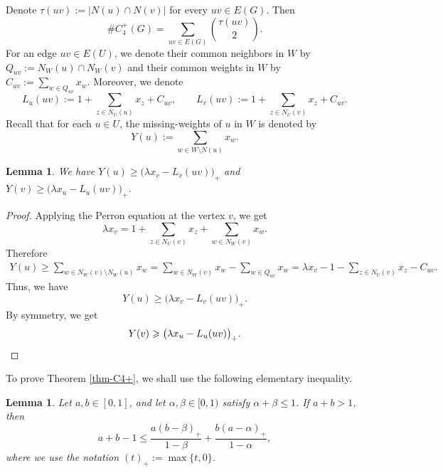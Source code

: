 \documentclass[11pt,a4paper]{article}
\newtheorem{lemma}[theorem]{Lemma}
\theoremstyle{definition}
\theoremstyle{plain}
\renewcommand{\le}{\leqslant}
\renewcommand{\ge}{\geqslant}
\begin{document}
\smallskip 
Denote $  \tau(uv):=|N(u)\cap N(v)|$ for every  $uv\in E(G)$. 
Then
\begin{equation}\label{eq:kite-book-count}
        \texttt{\#}{C_4^+}(G)=\sum_{uv\in E(G)}{\tau(uv)\choose 2}.
\end{equation}  
For an edge \(uv\in E(U)\), we denote their  common neighbors in $W$ by 
$ Q_{uv}:=N_W(u)\cap N_W(v)$ 
and their common weights in $W$ by 
$C_{uv}:=\sum_{w\in Q_{uv}}x_w$. 
Moreover, we denote 
\[
        L_u(uv):=1+\sum_{z\in N_U(u)}x_z +C_{uv},
        \qquad
        L_v(uv):=1+ \sum_{z\in N_U(v)}x_z +C_{uv}.
\]
Recall that for each $u\in U$, the missing-weights of $u$ in $W$ is denoted by 
$$ Y(u) :=\sum_{w\in W\setminus N(u)}x_w. $$ 

\begin{lemma} \label{lem:Yu-Yv-lower-weighted}
    We have $Y(u)\ge \bigl(\lambda x_v-L_v(uv)\bigr)_+$ and $Y(v)\ge \bigl(\lambda x_u-L_u(uv)\bigr)_+$. 
\end{lemma}

\begin{proof} 
Applying the Perron equation at the vertex \(v\), we get
\[
        \lambda x_v
        =
        1+\sum_{z\in N_U(v)}x_z+\sum_{w\in N_W(v)}x_w .
\]
Therefore
\[
\begin{aligned}
        Y(u)     
        \ge
        \sum_{w\in N_W(v)\setminus N_W(u)}x_w     =
        \sum_{w\in N_W(v)}x_w-\sum_{w\in Q_{uv}}x_w  =
        \lambda x_v-1- \sum_{z\in N_U(v)}x_z -C_{uv}.
\end{aligned}
\]
Thus, we have 
\begin{equation*}
        Y(u)\ge \bigl(\lambda x_v-L_v(uv)\bigr)_+.
\end{equation*}
By symmetry, we get 
\begin{equation*}
        Y(v)\ge \bigl(\lambda x_u-L_u(uv)\bigr)_+. \qedhere 
\end{equation*} 
\end{proof}

To prove Theorem \ref{thm-C4+}, 
we shall use the following elementary inequality.

\begin{lemma}\label{lem:kite-algebra}
Let \(a,b\in[0,1]\), and let \(\alpha,\beta\in[0,1)\) satisfy
\(\alpha+\beta\le1\).  If \(a+b>1\), then
\[
        a+b-1
        \le
        \frac{a(b-\beta)_+}{1-\beta}
        +
        \frac{b(a-\alpha)_+}{1-\alpha},
\]
where we use the notation \((t)_+:=\max\{t,0\}\).
\end{lemma}
\end{document}
